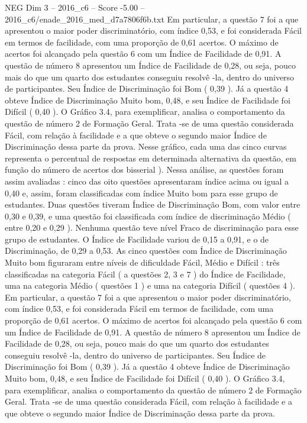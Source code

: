 \begin{textsample}{NEG Dim 3 – 2016\_c6 – Score -5.00 – 2016\_c6/enade\_2016\_med\_d7a7806f6b.txt}
Em particular, a questão 7 foi a que apresentou o maior poder discriminatório, com índice 0,53, e foi considerada Fácil em termos de facilidade, com uma proporção de 0,61 acertos.
O máximo de acertos foi alcançado pela questão 6 com um Índice de Facilidade de 0,91.
A questão de número 8 apresentou um Índice de Facilidade de 0,28, ou seja, pouco mais do que um quarto dos estudantes conseguiu resolvê -la, dentro do universo de participantes.
Seu Índice de Discriminação foi Bom ( 0,39 ).
Já a questão 4 obteve Índice de Discriminação Muito bom, 0,48, e seu Índice de Facilidade foi Difícil ( 0,40 ).
O Gráfico 3.4, para exemplificar, analisa o comportamento da questão de número 2 de Formação Geral.
Trata -se de uma questão considerada Fácil, com relação à facilidade e a que obteve o segundo maior Índice de Discriminação dessa parte da prova.
Nesse gráfico, cada uma das cinco curvas representa o percentual de respostas em determinada alternativa da questão, em função do número de acertos dos bisserial ).
Nessa análise, as questões foram assim avaliadas : cinco das oito questões apresentaram índice acima ou igual a 0,40 e, assim, foram classificadas com índice Muito bom para esse grupo de estudantes.
Duas questões tiveram Índice de Discriminação Bom, com valor entre 0,30 e 0,39, e uma questão foi classificada com índice de discriminação Médio ( entre 0,20 e 0,29 ).
Nenhuma questão teve nível Fraco de discriminação para esse grupo de estudantes.
O Índice de Facilidade variou de 0,15 a 0,91, e o de Discriminação, de 0,29 a 0,53.
As cinco questões com Índice de Discriminação Muito bom figuraram entre níveis de dificuldade Fácil, Médio e Difícil : três classificadas na categoria Fácil ( a questões 2, 3 e 7 ) do Índice de Facilidade, uma na categoria Médio ( questões 1 ) e uma na categoria Difícil ( questões 4 ).
Em particular, a questão 7 foi a que apresentou o maior poder discriminatório, com índice 0,53, e foi considerada Fácil em termos de facilidade, com uma proporção de 0,61 acertos.
O máximo de acertos foi alcançado pela questão 6 com um Índice de Facilidade de 0,91.
A questão de número 8 apresentou um Índice de Facilidade de 0,28, ou seja, pouco mais do que um quarto dos estudantes conseguiu resolvê -la, dentro do universo de participantes.
Seu Índice de Discriminação foi Bom ( 0,39 ).
Já a questão 4 obteve Índice de Discriminação Muito bom, 0,48, e seu Índice de Facilidade foi Difícil ( 0,40 ).
O Gráfico 3.4, para exemplificar, analisa o comportamento da questão de número 2 de Formação Geral.
Trata -se de uma questão considerada Fácil, com relação à facilidade e a que obteve o segundo maior Índice de Discriminação dessa parte da prova.

\end{textsample}
